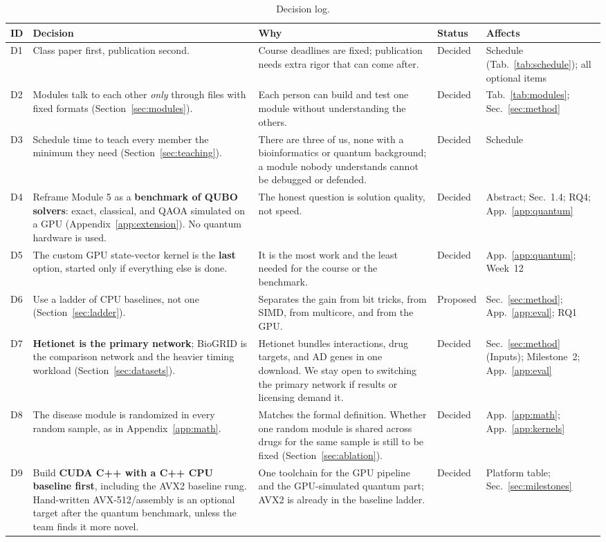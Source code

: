\begin{table}[!ht]
\centering
\small
\begin{tabularx}{\linewidth}{@{}l>{\raggedright\arraybackslash}X>{\raggedright\arraybackslash}Xll@{}}
\toprule
ID & Decision & Why & Status & Affects \\
\midrule
D1 & Class paper first, publication second. & Course deadlines are fixed; publication needs extra rigor that can come after. & Decided & Schedule (Tab.~\ref{tab:schedule}); all optional items \\
D2 & Modules talk to each other \emph{only} through files with fixed formats (Section~\ref{sec:modules}). & Each person can build and test one module without understanding the others. & Decided & Tab.~\ref{tab:modules}; Sec.~\ref{sec:method} \\
D3 & Schedule time to teach every member the minimum they need (Section~\ref{sec:teaching}). & There are three of us, none with a bioinformatics or quantum background; a module nobody understands cannot be debugged or defended. & Decided & Schedule \\
D4 & Reframe Module 5 as a \textbf{benchmark of QUBO solvers}: exact, classical, and QAOA simulated on a GPU (Appendix~\ref{app:extension}). No quantum hardware is used. & The honest question is solution quality, not speed. & Decided & Abstract; Sec.~1.4; RQ4; App.~\ref{app:quantum} \\
D5 & The custom GPU state-vector kernel is the \textbf{last} option, started only if everything else is done. & It is the most work and the least needed for the course or the benchmark. & Decided & App.~\ref{app:quantum}; Week~12 \\
D6 & Use a ladder of CPU baselines, not one (Section~\ref{sec:ladder}). & Separates the gain from bit tricks, from SIMD, from multicore, and from the GPU. & Proposed & Sec.~\ref{sec:method}; App.~\ref{app:eval}; RQ1 \\
D7 & \textbf{Hetionet is the primary network}; BioGRID is the comparison network and the heavier timing workload (Section~\ref{sec:datasets}). & Hetionet bundles interactions, drug targets, and AD genes in one download. We stay open to switching the primary network if results or licensing demand it. & Decided & Sec.~\ref{sec:method} (Inputs); Milestone~2; App.~\ref{app:eval} \\
D8 & The disease module is randomized in every random sample, as in Appendix~\ref{app:math}. & Matches the formal definition. Whether one random module is shared across drugs for the same sample is still to be fixed (Section~\ref{sec:ablation}). & Decided & App.~\ref{app:math}; App.~\ref{app:kernels} \\
D9 & Build \textbf{CUDA C++ with a C++ CPU baseline first}, including the AVX2 baseline rung. Hand-written AVX-512/assembly is an optional target after the quantum benchmark, unless the team finds it more novel. & One toolchain for the GPU pipeline and the GPU-simulated quantum part; AVX2 is already in the baseline ladder. & Decided & Platform table; Sec.~\ref{sec:milestones} \\
\bottomrule
\end{tabularx}
\caption{Decision log.}
\label{tab:decisions}
\end{table}

